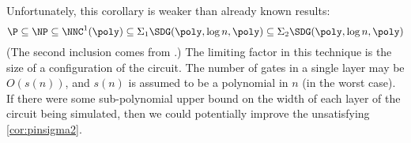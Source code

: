\documentclass{article}
\begin{document}
Unfortunately, this corollary is weaker than already known results:
\begin{equation*}
  \P \subseteq \NP \subseteq \NNC^1(\poly) \subseteq \Sigma_1 \SDG(\poly, \log n, \poly) \subseteq \Sigma_2 \SDG(\poly, \log n, \poly)
\end{equation*}
(The second inclusion comes from \autocite[Theorem~2.2]{wolf94}.)
The limiting factor in this technique is the size of a configuration of the circuit.
The number of gates in a single layer may be $O(s(n))$, and $s(n)$ is assumed to be a polynomial in $n$ (in the worst case).
If there were some sub-polynomial upper bound on the width of each layer of the circuit being simulated, then we could potentially improve the unsatisfying \autoref{cor:pinsigma2}.

\printbibliography
\end{document}
